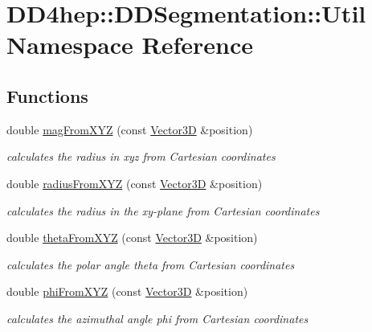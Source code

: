 \hypertarget{namespace_d_d4hep_1_1_d_d_segmentation_1_1_util}{
\section{DD4hep::DDSegmentation::Util Namespace Reference}
\label{namespace_d_d4hep_1_1_d_d_segmentation_1_1_util}
}
\subsection*{Functions}
\begin{DoxyCompactItemize}
\item 
double \hyperlink{namespace_d_d4hep_1_1_d_d_segmentation_1_1_util_a696e414df89c2948f71d83861bb91f96}{magFromXYZ} (const \hyperlink{struct_d_d4hep_1_1_d_d_segmentation_1_1_vector3_d}{Vector3D} \&position)
\begin{DoxyCompactList}\small\item\em calculates the radius in xyz from Cartesian coordinates \item\end{DoxyCompactList}\item 
double \hyperlink{namespace_d_d4hep_1_1_d_d_segmentation_1_1_util_a27d8eaa8e3001150da1b4cf657eecbb0}{radiusFromXYZ} (const \hyperlink{struct_d_d4hep_1_1_d_d_segmentation_1_1_vector3_d}{Vector3D} \&position)
\begin{DoxyCompactList}\small\item\em calculates the radius in the xy-\/plane from Cartesian coordinates \item\end{DoxyCompactList}\item 
double \hyperlink{namespace_d_d4hep_1_1_d_d_segmentation_1_1_util_a91c9acb845023538b301430609481e0e}{thetaFromXYZ} (const \hyperlink{struct_d_d4hep_1_1_d_d_segmentation_1_1_vector3_d}{Vector3D} \&position)
\begin{DoxyCompactList}\small\item\em calculates the polar angle theta from Cartesian coordinates \item\end{DoxyCompactList}\item 
double \hyperlink{namespace_d_d4hep_1_1_d_d_segmentation_1_1_util_aa8b3866b06a01bd33c74b6b4d5ff48a7}{phiFromXYZ} (const \hyperlink{struct_d_d4hep_1_1_d_d_segmentation_1_1_vector3_d}{Vector3D} \&position)
\begin{DoxyCompactList}\small\item\em calculates the azimuthal angle phi from Cartesian coordinates \item\end{DoxyCompactList}\item 

\end{DoxyCompactItemize}
